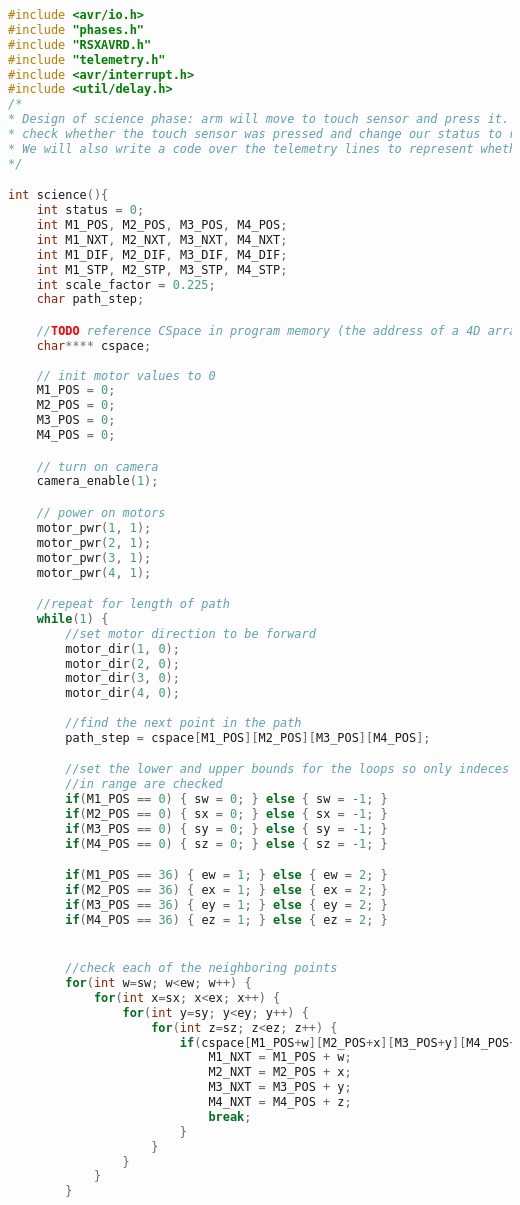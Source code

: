 \begin{lstlisting}[language=C]
#include <avr/io.h>
#include "phases.h"
#include "RSXAVRD.h"
#include "telemetry.h"
#include <avr/interrupt.h>
#include <util/delay.h>
/*
* Design of science phase: arm will move to touch sensor and press it. Upon moving the arm to the location, we will
* check whether the touch sensor was pressed and change our status to represent whether or not it was pressed.
* We will also write a code over the telemetry lines to represent whether or not the touch sensor was pressed.
*/

int science(){
	int status = 0;
	int M1_POS, M2_POS, M3_POS, M4_POS;
	int M1_NXT, M2_NXT, M3_NXT, M4_NXT;
	int M1_DIF, M2_DIF, M3_DIF, M4_DIF;
	int M1_STP, M2_STP, M3_STP, M4_STP;
	int scale_factor = 0.225;
	char path_step;

	//TODO reference CSpace in program memory (the address of a 4D array in program memory)
	char**** cspace;
		
	// init motor values to 0
	M1_POS = 0;
	M2_POS = 0;
	M3_POS = 0;
	M4_POS = 0;

	// turn on camera
	camera_enable(1);

	// power on motors
	motor_pwr(1, 1);
	motor_pwr(2, 1);
	motor_pwr(3, 1);
	motor_pwr(4, 1);

	//repeat for length of path
	while(1) {
		//set motor direction to be forward
		motor_dir(1, 0);
		motor_dir(2, 0);
		motor_dir(3, 0);
		motor_dir(4, 0);
		
		//find the next point in the path
		path_step = cspace[M1_POS][M2_POS][M3_POS][M4_POS];

		//set the lower and upper bounds for the loops so only indeces 
		//in range are checked
		if(M1_POS == 0) { sw = 0; } else { sw = -1; }
		if(M2_POS == 0) { sx = 0; } else { sx = -1; }
		if(M3_POS == 0) { sy = 0; } else { sy = -1; }
		if(M4_POS == 0) { sz = 0; } else { sz = -1; }

		if(M1_POS == 36) { ew = 1; } else { ew = 2; }
		if(M2_POS == 36) { ex = 1; } else { ex = 2; }
		if(M3_POS == 36) { ey = 1; } else { ey = 2; }
		if(M4_POS == 36) { ez = 1; } else { ez = 2; }


		//check each of the neighboring points
		for(int w=sw; w<ew; w++) {
			for(int x=sx; x<ex; x++) {
				for(int y=sy; y<ey; y++) {
					for(int z=sz; z<ez; z++) {
						if(cspace[M1_POS+w][M2_POS+x][M3_POS+y][M4_POS+z] == path_step + 1) {
							M1_NXT = M1_POS + w;
							M2_NXT = M2_POS + x;
							M3_NXT = M3_POS + y;
							M4_NXT = M4_POS + z;
							break;
						}
					}
				}
			}
		}


\end{lstlisting}
